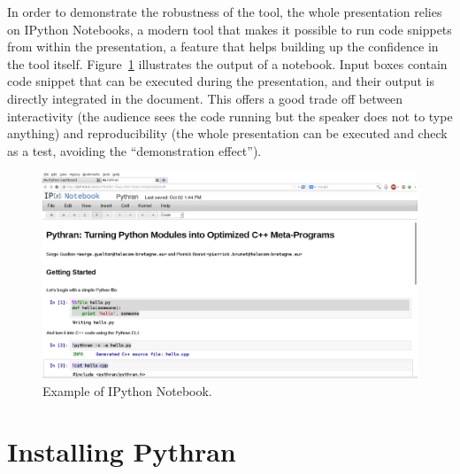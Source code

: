 \documentclass{llncs}
\begin{document}
In order to demonstrate the robustness of the tool, the whole presentation
relies on IPython Notebooks, a modern tool that makes it possible to
run code snippets from within the presentation, a feature that helps building
up the confidence in the tool itself. Figure~\ref{fig:notebook} illustrates the
output of a notebook. Input boxes contain code snippet that can be executed
during the presentation, and their output is directly integrated in the
document. This offers a good trade off between interactivity (the audience sees
the code running but the speaker does not to type anything) and reproducibility
(the whole presentation can be executed and check as a test, avoiding the
``demonstration effect'').

\begin{figure}
    \includegraphics[width=\textwidth]{pythran-notebook}
    \caption{Example of IPython Notebook.}
    \label{fig:notebook}
\end{figure}

%
%
%

\section*{Installing Pythran}
\label{sec:install}
\end{document}
